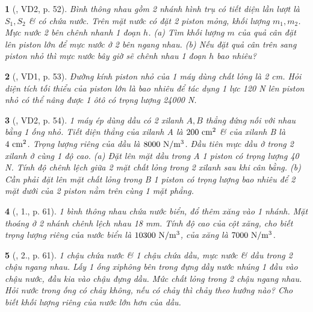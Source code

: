 \documentclass{article}
\newtheorem{baitoan}{}
\begin{document}
\begin{baitoan}[\cite{Van_Quyen_Hanh_Nhu_10_chuyen_Ly}, VD2, p. 52]
	Bình thông nhau gồm 2 nhánh hình trụ có tiết diện lần lượt là $S_1,S_2$ \& có chứa nước. Trên mặt nước có đặt 2 piston mỏng, khối lượng $m_1,m_2$. Mực nước 2 bên chênh nhanh 1 đoạn $h$. (a) Tìm khối lượng $m$ của quả cân đặt lên piston lớn để mực nước ở 2 bên ngang nhau. (b) Nếu đặt quả cân trên sang piston nhỏ thì mực nước bây giờ sẽ chênh nhau 1 đoạn $h$ bao nhiêu?
\end{baitoan}

\begin{baitoan}[\cite{Van_Quyen_Hanh_Nhu_10_chuyen_Ly}, VD1, p. 53]
	Đường kính piston nhỏ của 1 máy dùng chất lỏng là {\rm2 cm}. Hỏi diện tích tối thiểu của piston lớn là bao nhiêu để tác dụng 1 lực {\rm120 N} lên piston nhỏ có thể nâng được 1 ôtô có trọng lượng {\rm24000 N}.
\end{baitoan}

\begin{baitoan}[\cite{Van_Quyen_Hanh_Nhu_10_chuyen_Ly}, VD2, p. 54]
	1 máy ép dùng dầu có 2 xilanh $A,B$ thẳng đứng nối với nhau bằng 1 ống nhỏ. Tiết diện thẳng của xilanh A là $\rm200\ cm^2$ \& của xilanh B là $\rm4\ cm^2$. Trọng lượng riêng của dầu là $\rm8000\ N{\tt/}m^3$. Đầu tiên mực dầu ở trong 2 xilanh ở cùng 1 độ cao. (a) Đặt lên mặt dầu trong A 1 piston có trọng lượng {\rm40 N}. Tính độ chênh lệch giữa 2 mặt chất lỏng trong 2 xilanh sau khi cân bằng. (b) Cần phải đặt lên mặt chất lỏng trong B 1 piston có trọng lượng bao nhiêu để 2 mặt dưới của 2 piston nằm trên cùng 1 mặt phẳng.
\end{baitoan}

\begin{baitoan}[\cite{Van_Quyen_Hanh_Nhu_10_chuyen_Ly}, 1., p. 61]
	1 bình thông nhau chứa nước biển, đổ thêm xăng vào 1 nhánh. Mặt thoáng ở 2 nhánh chênh lệch nhau {\rm18 mm}. Tính độ cao của cột xăng, cho biết trọng lượng riêng của nước biển là $\rm10300\ N{\tt/}m^3$, của xăng là $\rm7000\ N{\tt/}m^3$.
\end{baitoan}

\begin{baitoan}[\cite{Van_Quyen_Hanh_Nhu_10_chuyen_Ly}, 2., p. 61]
	1 chậu chứa nước \& 1 chậu chứa dầu, mực nước \& dầu trong 2 chậu ngang nhau. Lấy 1 ống xiphông bên trong đựng dầy nước nhúng 1 đầu vào chậu nước, đầu kia vào chậu đựng dầu. Mức chất lỏng trong 2 chậu ngang nhau. Hỏi nước trong ống có chảy không, nếu có chảy thì chảy theo hướng nào? Cho biết khối lượng riêng của nước lớn hơn của dầu.
\end{baitoan}
\end{document}
